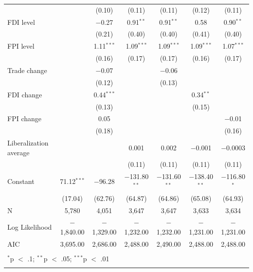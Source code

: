 \documentclass[a4paper]{article}\usepackage[]{graphicx}\usepackage[]{color}
\begin{document}
\begin{table}[!htbp]
\begin{tabular}{@{\extracolsep{5pt}}lcccccc}
  &  & (0.10) & (0.11) & (0.11) & (0.12) & (0.11) \\ 
  FDI level &  & $-$0.27 & 0.91$^{**}$ & 0.91$^{**}$ & 0.58 & 0.90$^{**}$ \\ 
  &  & (0.21) & (0.40) & (0.40) & (0.41) & (0.40) \\ 
  FPI level &  & 1.11$^{***}$ & 1.09$^{***}$ & 1.09$^{***}$ & 1.09$^{***}$ & 1.07$^{***}$ \\ 
  &  & (0.16) & (0.17) & (0.17) & (0.16) & (0.17) \\ 
  Trade change &  & $-$0.07 &  & $-$0.06 &  &  \\ 
  &  & (0.12) &  & (0.13) &  &  \\ 
  FDI change &  & 0.44$^{***}$ &  &  & 0.34$^{**}$ &  \\ 
  &  & (0.13) &  &  & (0.15) &  \\ 
  FPI change &  & 0.05 &  &  &  & $-$0.01 \\ 
  &  & (0.18) &  &  &  & (0.16) \\ 
  Liberalization average &  &  & 0.001 & 0.002 & $-$0.001 & $-$0.0003 \\ 
  &  &  & (0.11) & (0.11) & (0.11) & (0.11) \\ 
  Constant & 71.12$^{***}$ & $-$96.28 & $-$131.80$^{**}$ & $-$131.60$^{**}$ & $-$138.40$^{**}$ & $-$116.80$^{*}$ \\ 
  & (17.04) & (62.76) & (64.87) & (64.86) & (65.08) & (64.93) \\ 
 N & 5,780 & 4,051 & 3,647 & 3,647 & 3,633 & 3,634 \\ 
Log Likelihood & $-$1,840.00 & $-$1,329.00 & $-$1,232.00 & $-$1,232.00 & $-$1,231.00 & $-$1,231.00 \\ 
AIC & 3,695.00 & 2,686.00 & 2,488.00 & 2,490.00 & 2,488.00 & 2,488.00 \\ 
\hline \\[-1.8ex] 
\multicolumn{7}{l}{$^{*}$p $<$ .1; $^{**}$p $<$ .05; $^{***}$p $<$ .01} \\ 
\normalsize 
\end{tabular} 
\end{table} 
\end{document}
